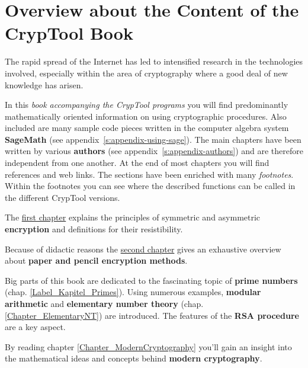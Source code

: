 %

\clearpage{}

\chapter*{Overview about the Content of the CrypTool Book}  

\parskip 4pt
The rapid spread of the Internet has led to intensified research in the
technologies involved, especially within the area of cryptography where a good
deal of new knowledge has arisen.

In this {\em book accompanying the CrypTool programs} 
you will find predominantly mathematically oriented information on using
cryptographic procedures. Also included are many sample code pieces written in the
computer algebra system {\bf SageMath} (see appendix~\ref{s:appendix-using-sage}).
The main chapters have been written by various {\bf authors}
(see appendix~\ref{s:appendix-authors}) %
and are therefore independent from one another. At the end of most chapters
you will find references and web links.
The sections have been enriched with many {\em footnotes}. Within the footnotes
you can see where the described functions can be called in the different CrypTool
versions.

The \hyperlink{Kapitel_1}{first chapter} explains the principles of symmetric
and asymmetric {\bf encryption} and definitions for their resistibility.

Because of didactic reasons the \hyperlink{Kapitel_PaperandPencil}
{second chapter} gives an exhaustive overview
about {\bf paper and pencil encryption methods}.

Big parts of this book are dedicated to the fascinating topic of 
{\bf prime numbers} (chap. \ref{Label_Kapitel_Primes}).
Using numerous examples, {\bf modular arithmetic} and 
{\bf elementary number theory} (chap. \ref{Chapter_ElementaryNT})
are introduced. The features of the {\bf RSA procedure} are a key aspect.

By reading chapter \ref{Chapter_ModernCryptography}
you'll gain an insight into the mathematical ideas and concepts behind 
{\bf modern cryptography}.

